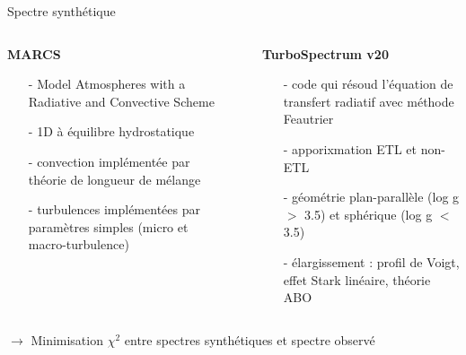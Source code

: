 \documentclass[10pt]{beamer}
\begin{document}
\begin{frame}[fragile]{Spectre synthétique}
    \begin{columns}
        \begin{column}{0.48\textwidth}
            \begin{center}
                \textbf{MARCS}
               \begin{itemize}
                \item [-] Model Atmospheres with a Radiative and Convective Scheme
                \item [-] 1D à équilibre hydrostatique
                \item [-] convection implémentée par théorie de longueur de mélange
                \item [-] turbulences implémentées par paramètres simples (micro et macro-turbulence)
               \end{itemize}
            \end{center}
        \end{column}
        \begin{column}{0.04\textwidth}
        \end{column}
        \begin{column}{0.48\textwidth}
            \begin{center}
                \textbf{TurboSpectrum v20}  
                \begin{itemize}
                    \item [-] code qui résoud l'équation de transfert radiatif avec méthode Feautrier
                    \item [-] apporixmation ETL et non-ETL
                    \item [-] géométrie plan-parallèle (log g $>$ 3.5) et sphérique (log g $<$ 3.5)
                    \item [-] élargissement : profil de Voigt, effet Stark linéaire, théorie ABO
                \end{itemize}
            \end{center}
        \end{column}

\end{columns}
\vfill 
$\rightarrow$ Minimisation $\chi^2$ entre spectres synthétiques et spectre observé
\end{frame}
\end{document}
